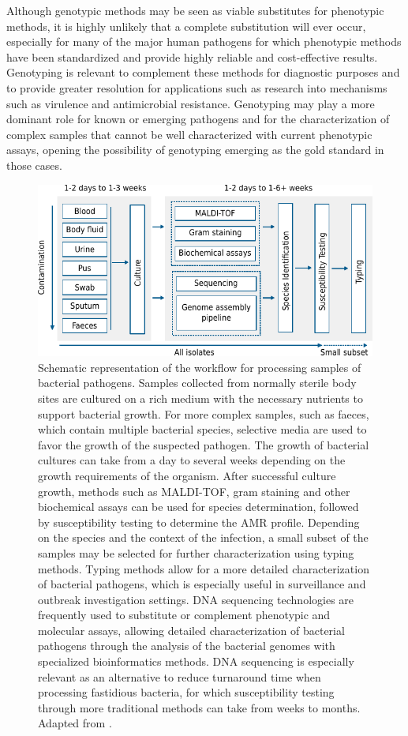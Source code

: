 Although genotypic methods may be seen as viable substitutes for phenotypic methods, it is highly unlikely that a complete substitution will ever occur, especially for many of the major human pathogens for which phenotypic methods have been standardized and provide highly reliable and cost-effective results. Genotyping is relevant to complement these methods for diagnostic purposes and to provide greater resolution for applications such as research into mechanisms such as virulence and antimicrobial resistance. Genotyping may play a more dominant role for known or emerging pathogens and for the characterization of complex samples that cannot be well characterized with current phenotypic assays, opening the possibility of genotyping emerging as the gold standard in those cases.

\begin{figure}[!ht]
    \centering
    \includegraphics[angle=0,width=\textwidth]{figures/introduction/Figure3.pdf}
    \caption[Schematic representation of the workflow for processing samples of bacterial pathogens.]{Schematic representation of the workflow for processing samples of bacterial pathogens. Samples collected from normally sterile body sites are cultured on a rich medium with the necessary nutrients to support bacterial growth. For more complex samples, such as faeces, which contain multiple bacterial species, selective media are used to favor the growth of the suspected pathogen. The growth of bacterial cultures can take from a day to several weeks depending on the growth requirements of the organism. After successful culture growth, methods such as \ac{MALDI-TOF}, gram staining and other biochemical assays can be used for species determination, followed by susceptibility testing to determine the \ac{AMR} profile. Depending on the species and the context of the infection, a small subset of the samples may be selected for further characterization using typing methods. Typing methods allow for a more detailed characterization of bacterial pathogens, which is especially useful in surveillance and outbreak investigation settings. DNA sequencing technologies are frequently used to substitute or complement phenotypic and molecular assays, allowing detailed characterization of bacterial pathogens through the analysis of the bacterial genomes with specialized bioinformatics methods. DNA sequencing is especially relevant as an alternative to reduce turnaround time when processing fastidious bacteria, for which susceptibility testing through more traditional methods can take from weeks to months. Adapted from \cite{didelot_transforming_2012, mendes_towards_2023}.}

\end{figure}

